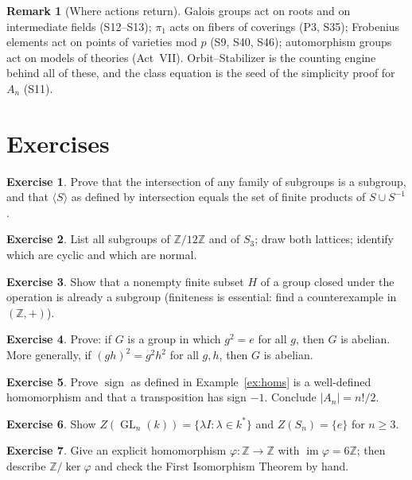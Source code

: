 \documentclass[11pt,a4paper]{article}
\theoremstyle{definition}
\newtheorem{remark}[theorem]{Remark}
\newtheorem{exercise}{Exercise}
\newcommand{\Z}{\mathbb{Z}}
\newcommand{\GL}{\operatorname{GL}}
\newcommand{\im}{\operatorname{im}}
\begin{document}
	\begin{remark}[Where actions return]\label{rem:actions-return}
		Galois groups act on roots and on intermediate fields (S12--S13); $\pi_1$ acts on fibers of coverings
		(P3, S35); Frobenius elements act on points of varieties mod $p$ (S9, S40, S46); automorphism groups
		act on models of theories (Act~VII). Orbit--Stabilizer is the counting engine behind all of these,
		and the class equation is the seed of the simplicity proof for $A_n$ (S11).
	\end{remark}
	
	\section{Exercises}
	\begin{exercise}
		Prove that the intersection of any family of subgroups is a subgroup, and that $\langle S\rangle$ as
		defined by intersection equals the set of finite products of $S\cup S^{-1}$.
	\end{exercise}
	\begin{exercise}
		List all subgroups of $\Z/12\Z$ and of $S_3$; draw both lattices; identify which are cyclic and which
		are normal.
	\end{exercise}
	\begin{exercise}
		Show that a nonempty finite subset $H$ of a group closed under the operation is already a subgroup
		(finiteness is essential: find a counterexample in $(\Z,+)$).
	\end{exercise}
	\begin{exercise}
		Prove: if $G$ is a group in which $g^2=e$ for all $g$, then $G$ is abelian. More generally, if
		$(gh)^2=g^2h^2$ for all $g,h$, then $G$ is abelian.
	\end{exercise}
	\begin{exercise}
		Prove $\operatorname{sign}$ as defined in Example~\ref{ex:homs} is a well-defined homomorphism and
		that a transposition has sign $-1$. Conclude $|A_n|=n!/2$.
	\end{exercise}
	\begin{exercise}
		Show $Z(\GL_n(k))=\{\lambda I:\lambda\in k^*\}$ and $Z(S_n)=\{e\}$ for $n\ge3$.
	\end{exercise}
	\begin{exercise}
		Give an explicit homomorphism $\varphi:\Z\to\Z$ with $\im\varphi=6\Z$; then describe
		$\Z/\ker\varphi$ and check the First Isomorphism Theorem by hand.
	\end{exercise}
\end{document}
